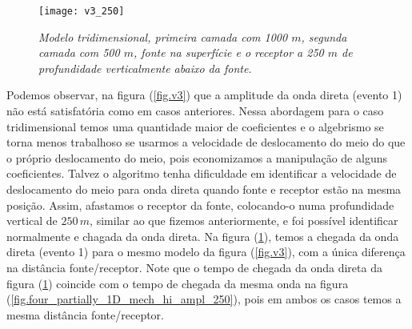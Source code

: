 \begin{figure}
\centering
\texttt{[image: v3\_250]}\\
\caption{\textit{Modelo tridimensional, primeira camada com 1000 $m$, segunda camada com 500 $m$, fonte na superf\'icie e o receptor a 250 $m$ de profundidade verticalmente abaixo da fonte.}}
\label{fig.v3_250}
\end{figure}

Podemos observar, na figura (\ref{fig.v3}) que a amplitude da onda direta (evento 1) n\~ao est\'a satisfat\'oria como em casos anteriores. Nessa abordagem para o caso tridimensional temos uma quantidade maior de coeficientes e o algebrismo se torna menos trabalhoso se usarmos a velocidade de deslocamento do meio do que o pr\'oprio deslocamento do meio, pois economizamos a manipula\c{c}\~ao de alguns coeficientes. Talvez o algoritmo tenha dificuldade em identificar a velocidade de deslocamento do meio para onda direta quando fonte e receptor est\~ao na mesma posi\c{c}\~ao. Assim, afastamos o receptor da fonte, colocando-o numa profundidade vertical de $250\,m$, similar ao que fizemos anteriormente, e foi poss\'ivel identificar normalmente e chagada da onda direta. Na figura (\ref{fig.v3_250}), temos a chegada da onda direta (evento 1) para o mesmo modelo da figura (\ref{fig.v3}), com a \'unica diferen\c{c}a na dist\^ancia fonte/receptor. Note que o tempo de chegada da onda direta da figura (\ref{fig.v3_250}) coincide com o tempo de chegada da mesma onda na figura (\ref{fig.four_partially_1D_mech_hi_ampl_250}), pois em ambos os casos temos a mesma dist\^ancia fonte/receptor.\\












































